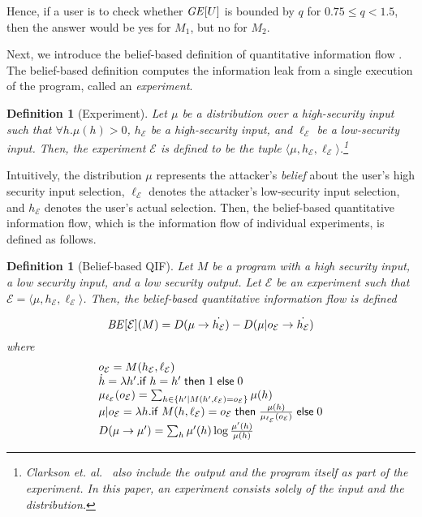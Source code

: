 \documentclass{llncs}
\newtheorem{definition}[theorem]{Definition}
\newcommand{\aset}[1]{\{{#1}\}}
\begin{document}
\noindent
Hence, if a user is to check whether ${\it GE}[U]$ is bounded by
$q$ for $0.75 \leq q < 1.5$, then the answer would be yes for $M_1$, but no
for $M_2$.

Next, we introduce the belief-based definition of quantitative
information flow \cite{clarkson:csf2005}.  The belief-based definition
computes the information leak from a single execution of the program,
called an {\em experiment}.

\begin{definition}[Experiment]
  Let $\mu$ be a distribution over a high-security input such that
  $\forall h.\mu(h)>0$, $h_\mathcal{E}$ be a high-security input, and
  $\ell_\mathcal{E}$ be a low-security input.  Then, the experiment
  $\mathcal{E}$ is defined to be the tuple $\langle
  \mu,h_\mathcal{E},\ell_\mathcal{E}\rangle$.\footnote{Clarkson et.
    al.~\cite{clarkson:csf2005} also include the output and the
    program itself as part of the experiment.  In this paper, an
    experiment consists solely of the input and the distribution.}
\end{definition}
Intuitively, the distribution $\mu$ represents the attacker's {\em belief}
about the user's high security input selection, $\ell_\mathcal{E}$
denotes the attacker's low-security input selection, and
$h_\mathcal{E}$ denotes the user's actual selection.  Then, the
belief-based quantitative information flow, which is the information flow
of individual experiments, is defined as follows.
\begin{definition}[Belief-based QIF]
\label{def:beliefqif}
Let $M$ be a program with a high security input, a low security input,
and a low security output.  Let $\mathcal{E}$ be an experiment such
that $\mathcal{E}=\langle \mu,h_\mathcal{E},\ell_\mathcal{E}\rangle$.
Then, the belief-based quantitative information flow is defined

\[ {\it BE}[\mathcal{E}](M)= D(\mu \rightarrow \dot{h_\mathcal{E}})-D(\mu |
o_\mathcal{E} \rightarrow \dot{h_\mathcal{E}}) 
\]where\[
\begin{array}{l}
  o_\mathcal{E}=M(h_\mathcal{E},\ell_\mathcal{E})\\

\dot{h}=\lambda h'. {\sf if}\;h=h'\;{\sf then}\;1\;{\sf else}\;0\\

\mu_{\ell_\mathcal{E}}(o_\mathcal{E})=\sum_{h\in \aset{h'\mid M(h',\ell_\mathcal{E}) =  o_\mathcal{E}}} \mu(h)\\

\mu | o_\mathcal{E}=\lambda h. {\sf
  if}\;M(h,\ell_\mathcal{E})=o_\mathcal{E}\;{\sf
  then}\;\frac{\mu(h)}{\mu_{\ell_\mathcal{E}}(o_\mathcal{E})}\;{\sf else}\;0\\

D(\mu\rightarrow \mu')=\sum_h \mu'(h)\log\frac{\mu'(h)}{\mu(h)}
\end{array}
\]
\end{definition}
\end{document}
